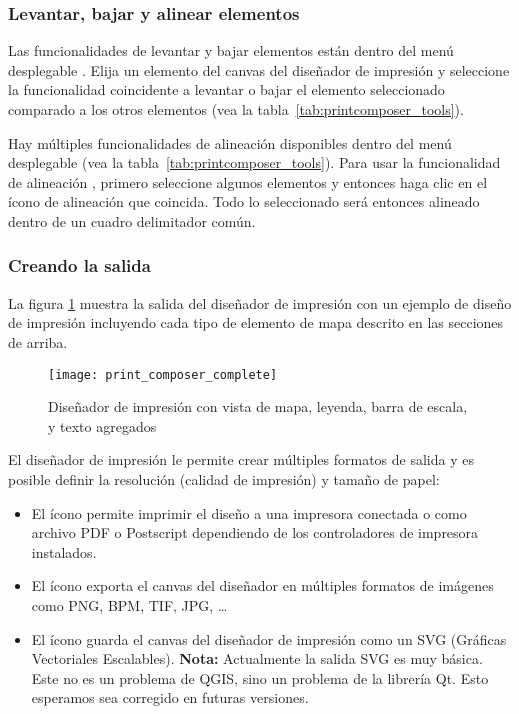 \subsubsection{Levantar, bajar y alinear elementos}

Las funcionalidades de levantar y bajar elementos están dentro del menú desplegable 
. Elija un elemento
del canvas del diseñador de impresión y seleccione la funcionalidad coincidente a
levantar o bajar el elemento seleccionado comparado a los otros elementos (vea la
tabla~\ref{tab:printcomposer_tools}). 

Hay múltiples funcionalidades de alineación disponibles dentro del menú desplegable
 (vea la
tabla~\ref{tab:printcomposer_tools}). Para usar la funcionalidad de alineación , primero
seleccione algunos elementos y entonces haga clic en el ícono de alineación que coincida. Todo
lo seleccionado será entonces alineado dentro de un cuadro delimitador común.       

\subsubsection{Creando la salida}

La figura \ref{fig:print_composer_complete} muestra la salida del diseñador de impresión con un ejemplo 
de diseño de impresión incluyendo cada tipo de elemento de mapa descrito en las secciones de arriba.

\begin{figure}[h]
   \begin{center}
   \caption{Diseñador de impresión con vista de mapa, leyenda, barra de escala, y texto agregados \nixcaption}
   \label{fig:print_composer_complete}\smallskip
   \texttt{[image: print\_composer\_complete]}
\end{center}  
\end{figure}

El diseñador de impresión le permite crear múltiples formatos de salida y es posible definir 
la resolución (calidad de impresión) y tamaño de papel:

\begin{itemize}
\item El ícono  permite imprimir el diseño 
a una impresora conectada o como archivo PDF o Postscript dependiendo de los controladores 
de impresora instalados.
\item El ícono  exporta el 
canvas del diseñador en múltiples formatos de imágenes como PNG, BPM, TIF, JPG, \dots
\item El ícono  guarda el canvas del diseñador 
de impresión como un SVG (Gráficas Vectoriales Escalables). \textbf{Nota:} Actualmente la 
salida SVG es muy básica. Este no es un problema de QGIS, sino un problema de la  
librería Qt. Esto esperamos sea corregido en futuras versiones.
\end{itemize}

